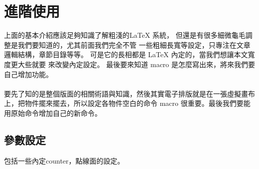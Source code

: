 \chapter{進階使用}
上面的基本介紹應該足夠知識了解粗淺的{\LaTeX} 系統，
但還是有很多細微龜毛調整是我們要知道的，尤其前面我們完全不管
一些粗細長寬等設定，只專注在文章邏輯結構，章節目錄等等。
可是它的長相都是 {\LaTeX} 內定的，當我們想讓本文寬度更大些就要
來改變內定設定。 最後要來知道 macro 是怎麼寫出來，將來我們要自己增加功能。
\\\\
要先了知的是整個版面的相關術語與知識，然後其實電子排版就是在一張虛擬畫布
上，把物件擺來擺去，所以設定各物件空白的命令 macro 很重要。最後我們要能
用原始命令增加自己的新命令。

\section{參數設定}
包括一些內定counter，點線面的設定。
